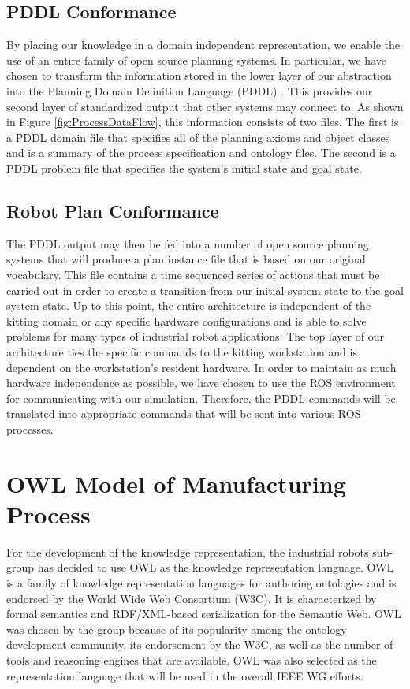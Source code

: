 \documentclass[a4paper, 10pt, conference]{ieeeconf}      %
\begin{document}
\subsection{PDDL Conformance}
By placing our knowledge in a domain independent representation, we enable the use of an entire family of open source planning systems.
In particular, we have chosen to transform the information stored in the lower layer of our abstraction into the Planning Domain Definition Language (PDDL) \cite{PDDL}.
This provides our second layer of standardized output that other systems may connect to. As shown in Figure \ref{fig:ProcessDataFlow}, this information consists of two files. The first
is a PDDL domain file that specifies all of the planning axioms and object classes and is a summary of the process specification and ontology files. The second is a PDDL problem file that
specifies the system's initial state and goal state.

\subsection{Robot Plan Conformance}
The PDDL output may then be fed into a number of open source planning systems that will produce a plan instance file that is based on our original vocabulary. This file
contains a time sequenced series of actions that must be carried out in order to create a transition from our initial system state to the goal system state. Up to this point,
the entire architecture is independent of the kitting domain or any specific hardware configurations and is able to solve problems for many types of industrial robot applications.
The top layer of our architecture ties the specific commands to the kitting workstation and is dependent on the workstation's resident hardware.  In order to maintain as
much hardware independence as possible, we have chosen to use the ROS environment for communicating with our simulation. Therefore, the PDDL commands will
be translated into appropriate commands that will be sent into various ROS processes.

\section{OWL Model of Manufacturing Process}
\label{sect:OWL_Layer}
For the development of the  knowledge representation, the industrial robots sub-group has decided to use OWL \cite{OWL} as the knowledge representation language. OWL is a family of knowledge representation languages for authoring ontologies and is endorsed by the World Wide Web Consortium (W3C). It is characterized by formal semantics and RDF/XML-based serialization for the Semantic Web. OWL was chosen by the group because of its popularity among the ontology development community, its endorsement by the W3C, as well as the number of tools and reasoning engines that are available. OWL was also selected as the representation language that will be used in the overall IEEE WG efforts.
\end{document}
